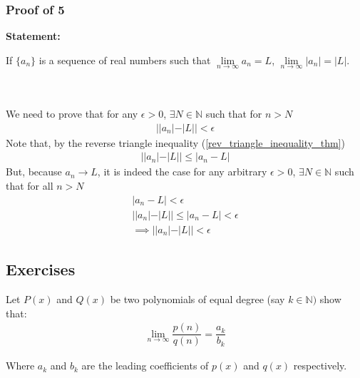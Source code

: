 \documentclass[12pt]{book}
\theoremstyle{definition}
\begin{document}
\subsubsection{Proof of 5}

\textbf{Statement:}

\noindent
If $\{a_n\}$ is a sequence of real numbers such that $\lim\limits_{n \to \infty}a_n =L $, $\lim\limits_{n \to \infty}|a_n| =|L| $.

\noindent
\\
\\
We need to prove that for any $\epsilon >0$, $\exists N \in \mathbb{N}$ such that for $n > N$
\begin{align*}
||a_n|-|L|| < \epsilon	
\end{align*}
Note that, by the reverse triangle inequality (\ref{rev_triangle_inequality_thm})
\begin{gather*}
||a_n|-|L|| \leq |a_n-L|
\end{gather*}
But, because $a_n \to L$, it is indeed the case for any arbitrary $\epsilon >0$, $\exists N \in \mathbb{N}$ such that for all $n >N$
\begin{align*}
|a_n -L| < \epsilon	\\
||a_n|-|L|| \leq |a_n-L| < \epsilon\\
\implies ||a_n|-|L|| < \epsilon
\end{align*}


\subsection{Exercises}

\begin{ex}{1.2}
Let $P(x)$ and $Q(x)$ be two polynomials of equal degree (say $ k \in \mathbb{N})$ show that:
\begin{align*}
\lim_{n \to \infty} \dfrac{p(n)}{q(n)} = \dfrac{a_k}{b_k}
\end{align*}

Where $a_k$ and $b_k$ are the leading coefficients of $p(x)$ and $q(x)$ respectively. 

\end{ex}
\end{document}
